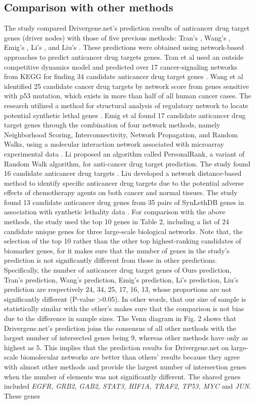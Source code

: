 \documentclass[5p,,preprint,12pt]{elsarticle}
\begin{document}
\subsection{Comparison with other methods} 
The study compared Drivergene.net’s prediction results of anticancer drug target genes (driver nodes) with those of five previous methods: Tran’s \cite{5}, Wang's \cite{67}, Emig’s \cite{68}, Li’s \cite{69}, and Liu’s \cite{70}. These predictions were obtained using network-based approaches to predict anticancer drug targets genes. Tran et al used an outside competitive dynamics model and predicted over 17 cancer-signaling networks from KEGG for finding 34 candidate anticancer drug target genes \cite{5}. Wang et al identified 25 candidate cancer drug targets by network score from genes sensitive with p53 mutation, which exists in more than half of all human cancer cases. The research utilized a method for structural analysis of regulatory network to locate potential synthetic lethal genes \cite{67}. Emig et al found 17 candidate anticancer drug target genes through the combination of four network methods, namely Neighborhood Scoring, Interconnectivity, Network Propagation, and Random Walks, using a molecular interaction network associated with microarray experimental data \cite{68}. Li proposed an algorithm called PersonalRank, a variant of Random Walk algorithm, for anti-cancer drug target prediction. The study found 16 candidate anticancer drug targets \cite{69}. Liu developed a network distance-based method to identify specific anticancer drug targets due to the potential adverse effects of chemotherapy agents on both cancer and normal tissues. The study found 13 candidate anticancer drug genes from 35 pairs of SynLethDB genes in association with synthetic lethality data \cite{70}. For comparison with the above methods, the study used the top 10 genes in Table 2, including a list of 24 candidate unique genes for three large-scale biological networks. Note that, the selection of the top 10 rather than the other top highest-ranking candidates of biomarker genes, for it makes sure that the number of genes in the study’s prediction is not significantly different from those in other predictions. Specifically, the number of anticancer drug target genes of Ours prediction, Tran’s prediction, Wang's prediction, Emig’s prediction, Li’s prediction, Liu’s prediction are respectively 24, 34, 25, 17, 16, 13, whose proportions are not significantly different (P-value >0.05). In other words, that our size of sample is statistically similar with the other’s makes sure that the comparison is not bias due to the difference in sample sizes. The Venn diagram in Fig. 2 shows that Drivergene.net’s prediction joins the consensus of all other methods with the largest number of intersected genes being 9, whereas other methods have only as highest as 5. This implies that the prediction results for Drivergene.net on large-scale biomolecular networks are better than others’ results because they agree with almost other methods and provide the largest number of intersection genes when the number of elements was not significantly different. The shared genes included \textit{EGFR, GRB2, GAB2, STAT3, HIF1A, TRAF2, TP53, MYC} and \textit{JUN}. These genes 
\end{document}
